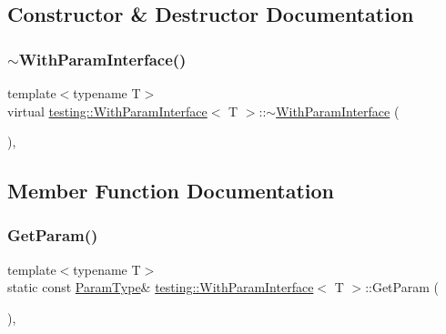 \subsection{Constructor \& Destructor Documentation}
\mbox{\label{classtesting_1_1WithParamInterface_a4e170bd42fa5e8ce48b80cee6bb52e26}} 
\subsubsection{\texorpdfstring{$\sim$\+With\+Param\+Interface()}{~WithParamInterface()}}
{\footnotesize\ttfamily template$<$typename T$>$ \\
virtual \hyperlink{classtesting_1_1WithParamInterface}{testing\+::\+With\+Param\+Interface}$<$ T $>$\+::$\sim$\hyperlink{classtesting_1_1WithParamInterface}{With\+Param\+Interface} (\begin{DoxyParamCaption}{ }\end{DoxyParamCaption})\hspace{0.3cm}{\ttfamily [inline]}, {\ttfamily [virtual]}}



\subsection{Member Function Documentation}
\mbox{\label{classtesting_1_1WithParamInterface_a1078d4493d7aa4d3e50d1d6c661bee4d}} 
\subsubsection{\texorpdfstring{Get\+Param()}{GetParam()}}
{\footnotesize\ttfamily template$<$typename T$>$ \\
static const \hyperlink{classtesting_1_1WithParamInterface_a343febaaebf1f025bda484f841d4fec1}{Param\+Type}\& \hyperlink{classtesting_1_1WithParamInterface}{testing\+::\+With\+Param\+Interface}$<$ T $>$\+::Get\+Param (\begin{DoxyParamCaption}{ }\end{DoxyParamCaption})\hspace{0.3cm}{\ttfamily [inline]}, {\ttfamily [static]}}

